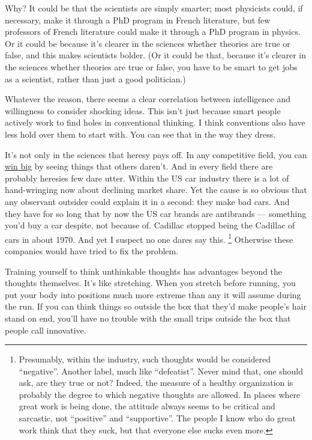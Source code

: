 \documentclass[12pt]{book}
\begin{document}
Why? It could be that the scientists are simply smarter; most physicists
could, if necessary, make it through a PhD program in French literature,
but few professors of French literature could make it through a PhD
program in physics. Or it could be because it's clearer in the sciences
whether theories are true or false, and this makes scientists bolder.
(Or it could be that, because it's clearer in the sciences whether
theories are true or false, you have to be smart to get jobs as a
scientist, rather than just a good politician.)

Whatever the reason, there seems a clear correlation between
intelligence and willingness to consider shocking ideas. This isn't just
because smart people actively work to find holes in conventional
thinking. I think conventions also have less hold over them to start
with. You can see that in the way they dress.

It's not only in the sciences that heresy pays off. In any competitive
field, you can \href{avg.html}{win big} by seeing things that others
daren't. And in every field there are probably heresies few dare utter.
Within the US car industry there is a lot of hand-wringing now about
declining market share. Yet the cause is so obvious that any observant
outsider could explain it in a second: they make bad cars. And they have
for so long that by now the US car brands are antibrands --- something
you'd buy a car despite, not because of. Cadillac stopped being the
Cadillac of cars in about 1970. And yet I suspect no one dares say this.
\footnote{Presumably, within the industry, such thoughts would be
considered ``negative''. Another label, much like ``defeatist''. Never
mind that, one should ask, are they true or not? Indeed, the measure of
a healthy organization is probably the degree to which negative thoughts
are allowed. In places where great work is being done, the attitude
always seems to be critical and sarcastic, not ``positive'' and
``supportive''. The people I know who do great work think that they
suck, but that everyone else sucks even more.} Otherwise these companies would have tried to fix the problem.

Training yourself to think unthinkable thoughts has advantages beyond
the thoughts themselves. It's like stretching. When you stretch before
running, you put your body into positions much more extreme than any it
will assume during the run. If you can think things so outside the box
that they'd make people's hair stand on end, you'll have no trouble with
the small trips outside the box that people call innovative.
\end{document}
